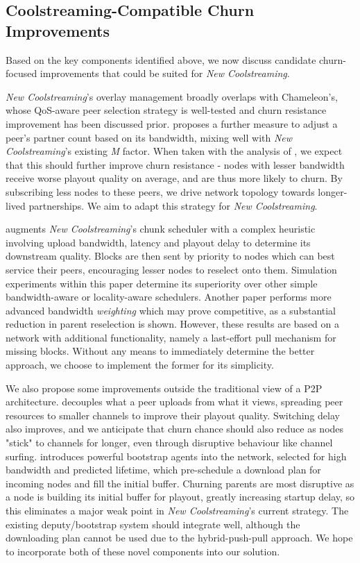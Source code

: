 \documentclass[12pt,a4paper]{article}
\begin{document}
\subsection{Coolstreaming-Compatible Churn Improvements}
Based on the key components identified above, we now discuss candidate churn-focused improvements that could be suited for \textit{New Coolstreaming}.

\textit{New Coolstreaming}'s overlay management broadly overlaps with Chameleon's, whose QoS-aware peer selection strategy is well-tested and churn resistance improvement has been discussed prior. \cite{Wang2013} proposes a further measure to adjust a peer's partner count based on its bandwidth, mixing well with \textit{New Coolstreaming}'s existing \textit{M} factor. When taken with the analysis of \cite{Vassilakis2010}, we expect that this should further improve churn resistance - nodes with lesser bandwidth receive worse playout quality on average, and are thus more likely to churn. By subscribing less nodes to these peers, we drive network topology towards longer-lived partnerships. We aim to adapt this strategy for \textit{New Coolstreaming}.

\cite{Ho2014} augments \textit{New Coolstreaming}'s chunk scheduler with a complex heuristic involving upload bandwidth, latency and playout delay to determine its downstream quality. Blocks are then sent by priority to nodes which can best service their peers, encouraging lesser nodes to reselect onto them. Simulation experiments within this paper determine its superiority over other simple bandwidth-aware or locality-aware schedulers. Another paper \cite{Li2010} performs more advanced bandwidth \textit{weighting} which may prove competitive, as a substantial reduction in parent reselection is shown. However, these results are based on a network with additional functionality, namely a last-effort pull mechanism for missing blocks. Without any means to immediately determine the better approach, we choose to implement the former for its simplicity.

We also propose some improvements outside the traditional view of a P2P architecture. \cite{Wu2009} decouples what a peer uploads from what it views, spreading peer resources to smaller channels to improve their playout quality. Switching delay also improves, and we anticipate that churn chance should also reduce as nodes "stick" to channels for longer, even through disruptive behaviour like channel surfing. \cite{Huang2010} introduces powerful bootstrap agents into  the network, selected for high bandwidth and predicted lifetime, which pre-schedule a download plan for incoming nodes and fill the initial buffer. Churning parents are most disruptive as a node is building its initial buffer for playout, greatly increasing startup delay, so this eliminates a major weak point in \textit{New Coolstreaming}'s current strategy. The existing deputy/bootstrap system should integrate well, although the downloading plan cannot be used due to the hybrid-push-pull approach. We hope to incorporate both of these novel components into our solution.
\end{document}
